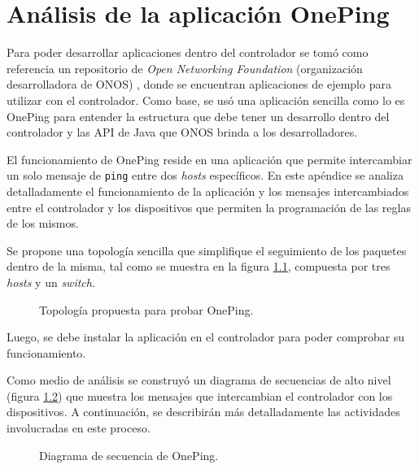 
\chapter{Análisis de la aplicación OnePing} %

\label{AppendixA} %
Para poder desarrollar aplicaciones dentro del controlador se tomó como referencia un repositorio de \textit{Open Networking Foundation} (organización desarrolladora de ONOS) \parencite{onos-samples}, donde se encuentran aplicaciones de ejemplo para utilizar con el controlador. Como base, se usó una aplicación sencilla como lo es OnePing para entender la estructura que debe tener un desarrollo dentro del controlador y las API de Java que ONOS brinda a los desarrolladores. 

El funcionamiento de OnePing reside en una aplicación que permite intercambiar un solo mensaje de \texttt{ping} entre dos \textit{hosts} específicos. En este apéndice se analiza detalladamente el funcionamiento de la aplicación y los mensajes intercambiados entre el controlador y los dispositivos que permiten la programación de las reglas de los mismos. 

Se propone una topología sencilla que simplifique el seguimiento de los paquetes dentro de la misma, tal como se muestra en la figura \ref{fig:onepingtopo}, compuesta por tres \textit{hosts} y un \textit{switch}.

\begin{figure}[th]
	\centering 
	\caption[Topología propuesta para probar OnePing]{Topología propuesta para probar OnePing.}
	\label{fig:onepingtopo}
\end{figure}


Luego, se debe instalar la aplicación en el controlador para poder comprobar su funcionamiento. 

Como medio de análisis se construyó un diagrama de secuencias de alto nivel (figura \ref{fig:sec-oneping}) que muestra los mensajes que intercambian el controlador con los dispositivos. A continuación, se describirán más detalladamente las actividades involucradas en este proceso.
\begin{figure}[th]
	\centering 
	\caption[Diagrama de secuencia de OnePing]{Diagrama de secuencia de OnePing.}
	\label{fig:sec-oneping}
\end{figure}


